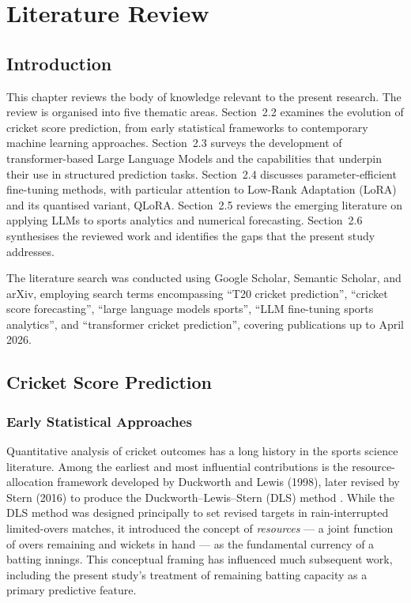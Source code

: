 \chapter{Literature Review}

\section{Introduction}

This chapter reviews the body of knowledge relevant to the present research. The review is organised into five thematic areas. Section~2.2 examines the evolution of cricket score prediction, from early statistical frameworks to contemporary machine learning approaches. Section~2.3 surveys the development of transformer-based Large Language Models and the capabilities that underpin their use in structured prediction tasks. Section~2.4 discusses parameter-efficient fine-tuning methods, with particular attention to Low-Rank Adaptation (LoRA) and its quantised variant, QLoRA. Section~2.5 reviews the emerging literature on applying LLMs to sports analytics and numerical forecasting. Section~2.6 synthesises the reviewed work and identifies the gaps that the present study addresses.

The literature search was conducted using Google Scholar, Semantic Scholar, and arXiv, employing search terms encompassing ``T20 cricket prediction'', ``cricket score forecasting'', ``large language models sports'', ``LLM fine-tuning sports analytics'', and ``transformer cricket prediction'', covering publications up to April 2026.

\section{Cricket Score Prediction}

\subsection{Early Statistical Approaches}

Quantitative analysis of cricket outcomes has a long history in the sports science literature. Among the earliest and most influential contributions is the resource-allocation framework developed by Duckworth and Lewis (1998), later revised by Stern (2016) to produce the Duckworth--Lewis--Stern (DLS) method \cite{duckworth1998fair, stern2016duckworth}. While the DLS method was designed principally to set revised targets in rain-interrupted limited-overs matches, it introduced the concept of \textit{resources} --- a joint function of overs remaining and wickets in hand --- as the fundamental currency of a batting innings. This conceptual framing has influenced much subsequent work, including the present study's treatment of remaining batting capacity as a primary predictive feature.

